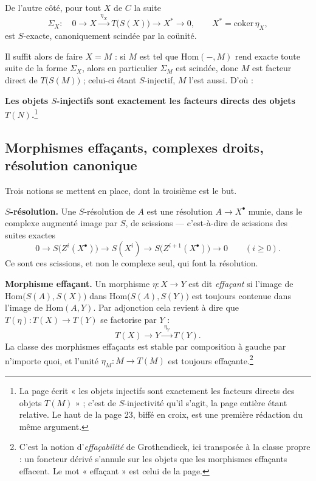 \documentclass[11pt,a4paper]{article}
\begin{document}
De l'autre côté, pour tout $X$ de $C$ la suite
\[
  \Sigma_{X} : \quad
  0 \longrightarrow X \xrightarrow{\;\eta_{X}\;} T\bigl( S(X) \bigr)
  \longrightarrow X^{*} \longrightarrow 0 ,
  \qquad X^{*} = \mathrm{coker}\,\eta_{X} ,
\]
est $S$-exacte, canoniquement scindée par la coünité.

Il suffit alors de faire $X = M$ : si $M$ est tel que $\mathrm{Hom}(-, M)$ rend
exacte toute suite de la forme $\Sigma_{X}$, alors en particulier
$\Sigma_{M}$ est scindée, donc $M$ est facteur direct de $T\bigl( S(M)
\bigr)$ ; celui-ci étant $S$-injectif, $M$ l'est aussi. D'où :

\textbf{Les objets $S$-injectifs sont exactement les facteurs directs des
objets $T(N)$.}\footnote{La page écrit « les objets injectifs sont exactement
les facteurs directs des objets $T(M)$ » ; c'est de $S$-injectivité qu'il
s'agit, la page entière étant relative. Le haut de la page 23, biffé en croix,
est une première rédaction du même argument.}

\subsection*{Morphismes effaçants, complexes droits, résolution canonique}

Trois notions se mettent en place, dont la troisième est le but.


\textbf{$S$-résolution.} Une $S$-résolution de $A$ est une résolution
$A \to X^{\bullet}$ munie, dans le complexe augmenté image par $S$, de
scissions — c'est-à-dire de scissions des suites exactes
\[
  0 \longrightarrow S\bigl( Z^{i}(X^{\bullet}) \bigr) \longrightarrow
  S(X^{i}) \longrightarrow S\bigl( Z^{i+1}(X^{\bullet}) \bigr)
  \longrightarrow 0 \qquad (i \geqslant 0) .
\]
Ce sont ces scissions, et non le complexe seul, qui font la résolution.


\textbf{Morphisme effaçant.} Un morphisme $\eta : X \to Y$ est dit
\emph{effaçant} si l'image de $\mathrm{Hom}\bigl( S(A), S(X) \bigr)$ dans
$\mathrm{Hom}\bigl( S(A), S(Y) \bigr)$ est toujours contenue dans l'image de
$\mathrm{Hom}(A, Y)$. Par adjonction cela revient à dire que $T(\eta) : T(X)
\to T(Y)$ se factorise par $Y$ :
\[
  T(X) \longrightarrow Y \xrightarrow{\;\eta_{Y}\;} T(Y) .
\]
La classe des morphismes effaçants est stable par composition à gauche par
n'importe quoi, et l'unité $\eta_{M} : M \to T(M)$ est toujours
effaçante.\footnote{C'est la notion d'\emph{effaçabilité} de Grothendieck, ici
transposée à la classe propre : un foncteur dérivé s'annule sur les objets que
les morphismes effaçants effacent. Le mot « effaçant » est celui de la page.}
\end{document}
